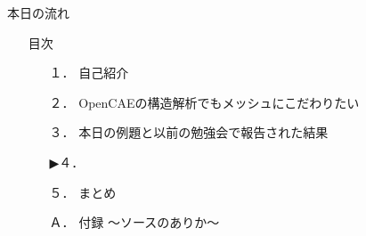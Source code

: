 \begin{frame}{本日の流れ}
  \begin{itemize}
      \item[] 目次
      \begin{itemize}[itemsep=1.3ex, leftmargin=1cm]
        \item[１．] 自己紹介
        \item[２．] OpenCAEの構造解析でもメッシュにこだわりたい
        \item[３．] 本日の例題と以前の勉強会で報告された結果
        \item[▶４．] 
        \item[５．] まとめ
        \item[Ａ．] 付録 ～ソースのありか～
      \end{itemize}
  \end{itemize}
\end{frame}
